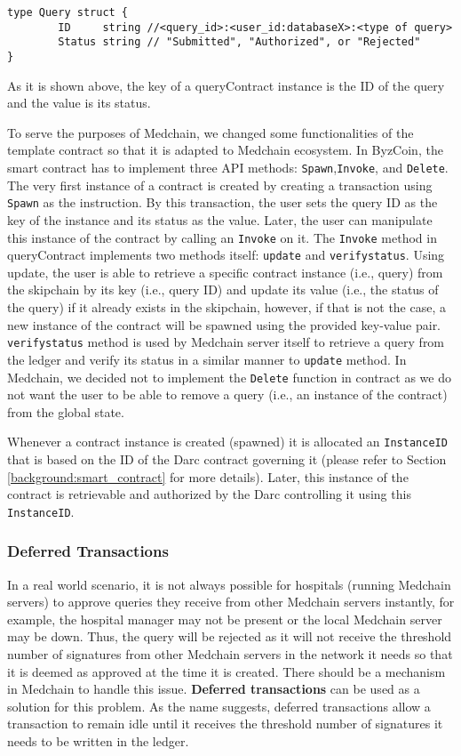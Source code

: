 \begin{verbatim}
type Query struct {
	    ID     string //<query_id>:<user_id:databaseX>:<type of query>
	    Status string // "Submitted", "Authorized", or "Rejected"
} 
\end{verbatim}

As it is shown above, the key of a queryContract instance is the ID of the query and the value is its status.  

To serve the purposes of Medchain, we changed some functionalities of the template contract so that it is adapted to Medchain ecosystem. In ByzCoin, the smart contract has to implement three API methods: \texttt{Spawn},\texttt{Invoke}, and \texttt{Delete}. The very first instance of a contract is created by creating a transaction using \texttt{Spawn} as the instruction. By this transaction, the user sets the query ID as the key of the instance and its status as the value. Later, the user can manipulate this instance of the contract by calling an \texttt{Invoke} on it. The \texttt{Invoke} method in queryContract implements two methods itself: \texttt{update} and \texttt{verifystatus}. Using update, the user is able to retrieve a specific contract instance (i.e., query) from the skipchain by its key (i.e., query ID) and update its value (i.e., the status of the query) if it already exists in the skipchain, however, if that is not the case, a new instance of the contract will be spawned using the provided key-value pair. \texttt{verifystatus} method is used by Medchain server itself to retrieve a query from the ledger and verify its status in a similar manner to \texttt{update} method. In Medchain, we decided not to implement the \texttt{Delete} function in contract as we do not want the user to be able to remove a query (i.e., an instance of the contract) from the global state. 

Whenever a contract instance is created (spawned) it is allocated an \texttt{InstanceID} that is based on the ID of the Darc contract governing it (please refer to Section \ref{background:smart_contract} for more details). Later, this instance of the contract is retrievable and authorized by the Darc controlling it using this \texttt{InstanceID}. 

\subsubsection{Deferred Transactions} \label{impl:deferred_tx}
In a real world scenario, it is not always possible for hospitals (running Medchain servers) to approve queries they receive from other Medchain servers instantly, for example, the hospital manager may not be present or the local Medchain server may be down. Thus, the query will be rejected as it will not receive the threshold number of signatures from other Medchain servers in the network it needs so that it is deemed as approved at the time it is created. There should be a mechanism in Medchain to handle this issue. \textbf{Deferred transactions} can be used as a solution for this problem. As the name suggests, deferred transactions allow a transaction to remain idle until it receives the threshold number of signatures it needs to be written in the ledger.  

